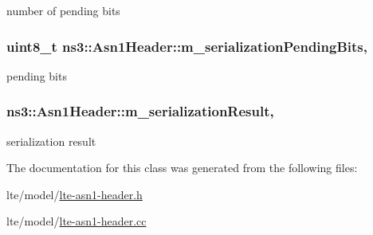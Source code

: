 number of pending bits 

\subsubsection[{\texorpdfstring{m\+\_\+serialization\+Pending\+Bits}{m_serializationPendingBits}}]{\setlength{\rightskip}{0pt plus 5cm}uint8\+\_\+t ns3\+::\+Asn1\+Header\+::m\+\_\+serialization\+Pending\+Bits\hspace{0.3cm}{\ttfamily [mutable]}, {\ttfamily [protected]}}\hypertarget{classns3_1_1Asn1Header_ad48f6854caeba65c2631675cf416a2c9}{}\label{classns3_1_1Asn1Header_ad48f6854caeba65c2631675cf416a2c9}


pending bits 

\subsubsection[{\texorpdfstring{m\+\_\+serialization\+Result}{m_serializationResult}}]{ ns3\+::\+Asn1\+Header\+::m\+\_\+serialization\+Result\hspace{0.3cm}{\ttfamily [mutable]}, {\ttfamily [protected]}}\hypertarget{classns3_1_1Asn1Header_a758b74023ea5bf40941af6f0a6a66058}{}\label{classns3_1_1Asn1Header_a758b74023ea5bf40941af6f0a6a66058}


serialization result 



The documentation for this class was generated from the following files\+:\begin{DoxyCompactItemize}
\item 
lte/model/\hyperlink{lte-asn1-header_8h}{lte-\/asn1-\/header.\+h}\item 
lte/model/\hyperlink{lte-asn1-header_8cc}{lte-\/asn1-\/header.\+cc}\end{DoxyCompactItemize}
